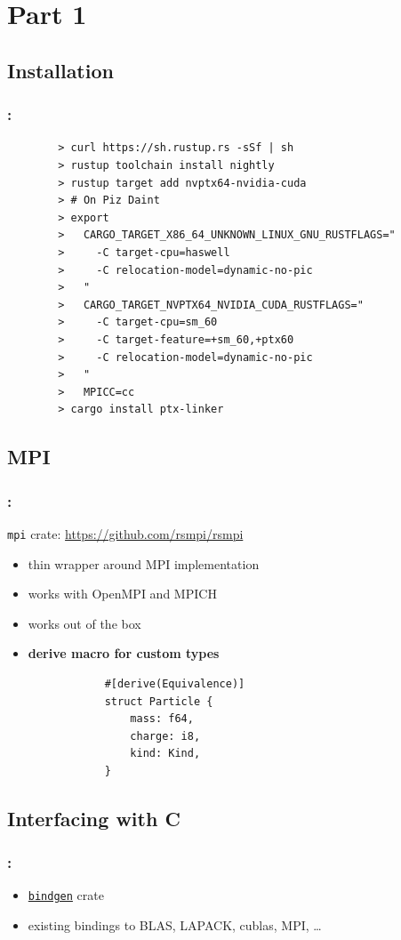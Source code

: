 \documentclass[aspectratio=43, t]{beamer}
\begin{document}
\section*{Part 1}
\subsection*{Installation}
\begin{frame}[fragile]
	\frametitle{\secname: \subsecname}
	\begin{verbatim}
		> curl https://sh.rustup.rs -sSf | sh
		> rustup toolchain install nightly
		> rustup target add nvptx64-nvidia-cuda
		> # On Piz Daint
		> export
		>   CARGO_TARGET_X86_64_UNKNOWN_LINUX_GNU_RUSTFLAGS="
		>     -C target-cpu=haswell
		>     -C relocation-model=dynamic-no-pic
		>   "
		>   CARGO_TARGET_NVPTX64_NVIDIA_CUDA_RUSTFLAGS="
		>     -C target-cpu=sm_60
		>     -C target-feature=+sm_60,+ptx60
		>     -C relocation-model=dynamic-no-pic
		>   "
		>   MPICC=cc
		> cargo install ptx-linker
		\end{verbatim}
\end{frame}

\subsection*{MPI}
\begin{frame}[fragile]
	\frametitle{\secname: \subsecname}

	\texttt{mpi} crate: \url{https://github.com/rsmpi/rsmpi}

	\begin{itemize}
		\item thin wrapper around MPI implementation
		\item works with OpenMPI and MPICH
		\item works out of the box
		\item \textbf{derive macro for custom types}
		\begin{verbatim}
			#[derive(Equivalence)]
			struct Particle {
				mass: f64,
				charge: i8,
				kind: Kind,
			}
		\end{verbatim}
	\end{itemize}
\end{frame}

\subsection*{Interfacing with C}
\begin{frame}
	\frametitle{\secname: \subsecname}
	\begin{itemize}
		\item \href{https://rust-lang.github.io/rust-bindgen/introduction.html}{\texttt{bindgen}} crate
		\item existing bindings to BLAS, LAPACK, cublas, MPI, …
	\end{itemize}
\end{frame}
\end{document}
